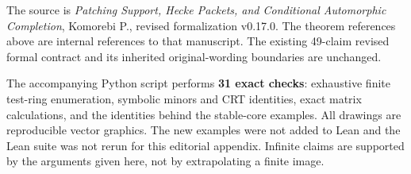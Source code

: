 The source is \emph{Patching Support, Hecke Packets, and Conditional Automorphic Completion}, Komorebi P., revised formalization v0.17.0. The theorem references above are internal references to that manuscript. The existing 49-claim revised formal contract and its inherited original-wording boundaries are unchanged.

The accompanying Python script performs \textbf{31 exact checks}: exhaustive finite test-ring enumeration, symbolic minors and CRT identities, exact matrix calculations, and the identities behind the stable-core examples. All drawings are reproducible vector graphics. The new examples were not added to Lean and the Lean suite was not rerun for this editorial appendix. Infinite claims are supported by the arguments given here, not by extrapolating a finite image.
